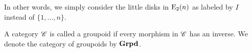 In other words, we simply consider the little disks in $\operatorname{E}_2(n)$ as labeled by $I$
instead of $\{1,...,n\}$. 

\begin{defin}
    A category $\mathscr{C}$ is called a groupoid if every morphism in $\mathscr{C}$ has an
    inverse. We denote the category of groupoids by $\operatorname{\textbf{Grpd}}$.
\end{defin}



